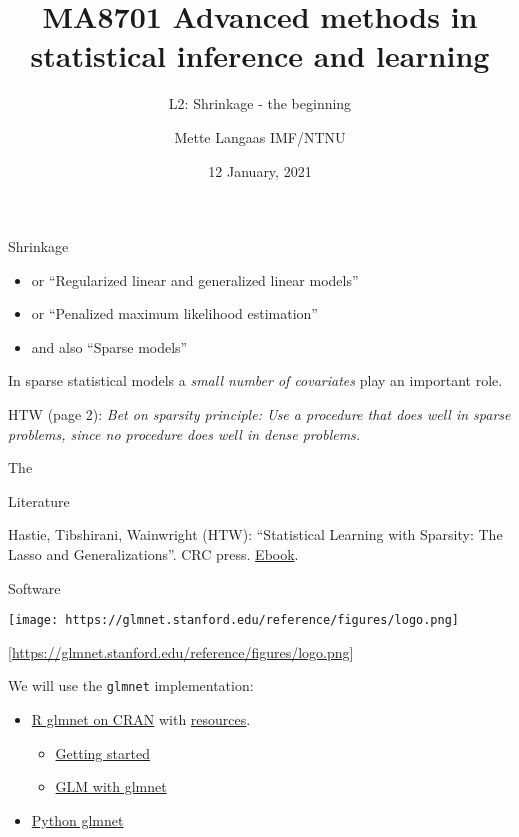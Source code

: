 \documentclass[
  ignorenonframetext,
]{beamer}
\title{MA8701 Advanced methods in statistical inference and learning}
\subtitle{L2: Shrinkage - the beginning}
\author{Mette Langaas IMF/NTNU}
\date{12 January, 2021}
\providecommand{\tightlist}{%
  \setlength{\itemsep}{0pt}\setlength{\parskip}{0pt}}
\begin{document}
\frame{\titlepage}

\begin{frame}[fragile]{Shrinkage}
\protect\hypertarget{shrinkage}{}

\begin{itemize}
\tightlist
\item
  or ``Regularized linear and generalized linear models''
\item
  or ``Penalized maximum likelihood estimation''
\item
  and also ``Sparse models''
\end{itemize}

In sparse statistical models a \emph{small number of covariates} play an
important role.

HTW (page 2): \emph{Bet on sparsity principle: Use a procedure that does
well in sparse problems, since no procedure does well in dense
problems.}

\begin{block}{The}

\end{block}

\begin{block}{Literature}

Hastie, Tibshirani, Wainwright (HTW): ``Statistical Learning with
Sparsity: The Lasso and Generalizations''. CRC press.
\href{https://trevorhastie.github.io/}{Ebook}.

\end{block}

\begin{block}{Software}

\texttt{[image: https://glmnet.stanford.edu/reference/figures/logo.png]}

{[}\url{https://glmnet.stanford.edu/reference/figures/logo.png}{]}

We will use the \texttt{glmnet} implementation:

\begin{itemize}
\tightlist
\item
  \href{https://cran.r-project.org/web/packages/glmnet/index.html}{R
  glmnet on CRAN} with
  \href{http://www.stanford.edu/~hastie/glmnet}{resources}.

  \begin{itemize}
  \tightlist
  \item
    \href{https://glmnet.stanford.edu/articles/glmnet.html}{Getting
    started}
  \item
    \href{https://glmnet.stanford.edu/articles/glmnetFamily.html}{GLM
    with glmnet}
  \end{itemize}
\item
  \href{https://web.stanford.edu/~hastie/glmnet_python/}{Python glmnet}
\end{itemize}


\end{block}
\end{frame}
\end{document}

